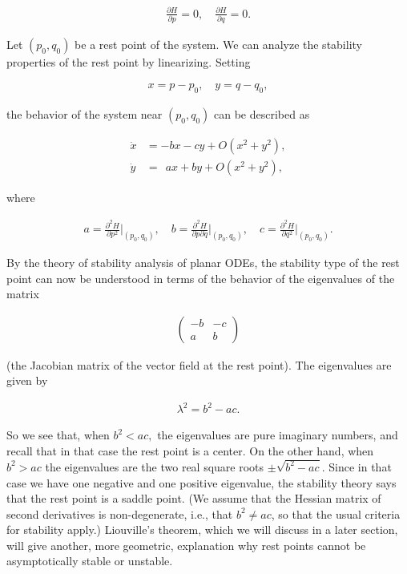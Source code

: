 \documentclass[11pt]{report}
\theoremstyle{plain}
\theoremstyle{definition}
\begin{document}
\begin{align*}
\frac{\partial H}{\partial p} = 0, \quad \frac{\partial H}{\partial q} = 0.
\end{align*}

Let $(p_0,q_0)$ be a rest point of the system. We can
analyze the stability properties of the rest point by
linearizing. Setting

\begin{align*}
x = p-p_0, \quad y=q-q_0,
\end{align*}

the behavior of the system near $(p_0,q_0)$ can be
described as

\begin{align*}
\dot{x} &= -bx-cy + O(x^2+y^2), \\ \dot{y}&= \ \ ax+by + O(x^2+y^2),
\end{align*}

where

\begin{align*}
a = \frac{\partial^2 H}{\partial p^2} \Big|_{(p_0,q_0)},\quad
b = \frac{\partial^2 H}{\partial p \partial q} \Big|_{(p_0,q_0)}, \quad
c = \frac{\partial^2 H}{\partial q^2} \Big|_{(p_0,q_0)}.
\end{align*}

By the theory of stability analysis of planar ODEs,
the stability type of the rest point can now be
understood in terms of the behavior of the eigenvalues
of the matrix

\begin{align*}
\left(\begin{array}{cc} -b&-c\\a&b\end{array}\right)
\end{align*}

(the Jacobian matrix of the vector field at the rest
point). The eigenvalues are given by

\begin{align*}
\lambda^2 = b^2-ac.
\end{align*}

So we see that, when $b^2<ac,$ the eigenvalues are
pure imaginary numbers, and recall that in that case
the rest point is a center. On the other hand, when
$b^2>ac$ the eigenvalues are the two real square
roots $\pm \sqrt{b^2-ac}$. Since in that case we have
one negative and one positive eigenvalue, the
stability theory says that the rest point is a saddle
point. (We assume that the Hessian matrix of second
derivatives is non-degenerate, i.e., that
$b^2\neq ac$, so that the usual criteria for
stability apply.) Liouville's theorem, which we will
discuss in a later section, will give another, more
geometric, explanation why rest points cannot be
asymptotically stable or unstable.
\end{document}
